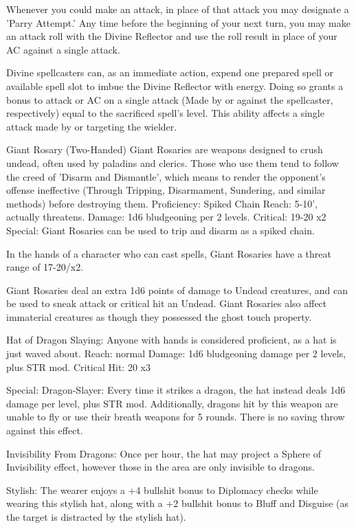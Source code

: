Whenever you could make an attack, in place of that attack you may designate a 'Parry Attempt.' Any time before the beginning of your next turn, you may make an attack roll with the Divine Reflector and use the roll result in place of your AC against a single attack.

Divine spellcasters can, as an immediate action, expend one prepared spell or available spell slot to imbue the Divine Reflector with energy. Doing so grants a bonus to attack or AC on a single attack (Made by or against the spellcaster, respectively) equal to the sacrificed spell's level. This ability affects a single attack made by or targeting the wielder.


Giant Rosary (Two-Handed)
Giant Rosaries are weapons designed to crush undead, often used by paladins and clerics. Those who use them tend to follow the creed of 'Disarm and Dismantle', which means to render the opponent's offense ineffective (Through Tripping, Disarmament, Sundering, and similar methods) before destroying them.
Proficiency: Spiked Chain
Reach: 5-10', actually threatens.
Damage: 1d6 bludgeoning per 2 levels.
Critical: 19-20 x2
Special:
Giant Rosaries can be used to trip and disarm as a spiked chain.

In the hands of a character who can cast spells, Giant Rosaries have a threat range of 17-20/x2.

Giant Rosaries deal an extra 1d6 points of damage to Undead creatures, and can be used to sneak attack or critical hit an Undead. Giant Rosaries also affect immaterial creatures as though they possessed the ghost touch property.


Hat of Dragon Slaying:
Anyone with hands is considered proficient, as a hat is just waved about.
Reach: normal
Damage: 1d6 bludgeoning damage per 2 levels, plus STR mod.
Critical Hit: 20 x3

Special:
Dragon-Slayer: Every time it strikes a dragon, the hat instead deals 1d6 damage per level, plus STR mod. Additionally, dragons hit by this weapon are unable to fly or use their breath weapons for 5 rounds. There is no saving throw against this effect.

Invisibility From Dragons: Once per hour, the hat may project a Sphere of Invisibility effect, however those in the area are only invisible to dragons.

Stylish: The wearer enjoys a +4 bullshit bonus to Diplomacy checks while wearing this stylish hat, along with a +2 bullshit bonus to Bluff and Disguise (as the target is distracted by the stylish hat).

